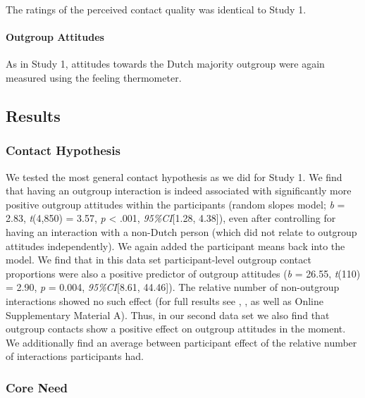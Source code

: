 The ratings of the perceived contact quality was identical to Study 1.

\paragraph{Outgroup Attitudes}

As in Study 1, attitudes towards the Dutch majority outgroup were again
measured using the feeling thermometer.

\subsection{Results}

\subsubsection{Contact Hypothesis}

We tested the most general contact hypothesis as we did for Study 1. We
find that having an outgroup interaction is indeed associated with
significantly more positive outgroup attitudes within the participants
(random slopes model; \textit{b} = 2.83, \textit{t}(4,850) = 3.57,
\textit{p} \textless{} .001, \textit{95\%CI}{[}1.28, 4.38{]}), even
after controlling for having an interaction with a non-Dutch person
(which did not relate to outgroup attitudes independently). We again
added the participant means back into the model. We find that in this
data set participant-level outgroup contact proportions were also a
positive predictor of outgroup attitudes (\textit{b} = 26.55,
\textit{t}(110) = 2.90, \textit{p} = 0.004, \textit{95\%CI}{[}8.61,
44.46{]}). The relative number of non-outgroup interactions showed no
such effect (for full results see ,
, as well as Online Supplementary Material
A). Thus, in our second data set we also find that outgroup contacts
show a positive effect on outgroup attitudes in the moment. We
additionally find an average between participant effect of the relative
number of interactions participants had.

\subsubsection{Core Need}

